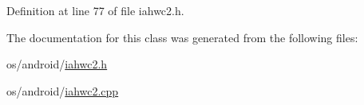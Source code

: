 Definition at line 77 of file iahwc2.\+h.


\begin{DoxyCode}{0}
\end{DoxyCode}


The documentation for this class was generated from the following files\+:\begin{DoxyCompactItemize}
\item 
os/android/\mbox{\hyperlink{iahwc2_8h}{iahwc2.\+h}}\item 
os/android/\mbox{\hyperlink{iahwc2_8cpp}{iahwc2.\+cpp}}\end{DoxyCompactItemize}
